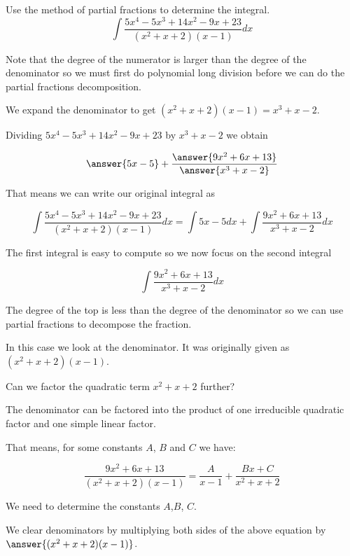 \documentclass{ximera}
\author{Jason Miller}
\begin{document}
\begin{exercise}
Use the method of partial fractions to determine the integral.
\[
\int \frac{5x^{4}-5x^{3}+14x^{2}-9x+23}{(x^{2}+x+2)(x-1)} dx
\]


Note that the degree of the numerator is larger than the degree of the denominator so we must first do polynomial 
long division before we can do the partial fractions decomposition. 

We expand the denominator to get 
$(x^{2}+x+2)(x-1)=x^{3}+x-2$. 

Dividing $5x^{4}-5x^{3}+14x^{2}-9x+23$ by $x^{3}+x-2$ we obtain

\[
\answer{ 5x-5}  + \frac{\answer{9x^{2}+6x+13}}{\answer{x^{3}+x-2}} 
\]


\begin{exercise}

That means we can write our original integral as

\[
\int \frac{5x^{4}-5x^{3}+14x^{2}-9x+23}{(x^{2}+x+2)(x-1)} dx= \int 5x-5 dx + \int \frac{9x^{2}+6x+13}{x^3+x-2} dx
\]

The first integral is easy to compute so we now focus on the second integral 

\[
 \int \frac{9x^{2}+6x+13}{x^{3}+x-2} dx
\]

The degree of the top is less than the degree of the denominator so we can use partial fractions to 
decompose the fraction. 


In this case we look at the denominator. It was originally given as $(x^{2}+x+2)(x-1)$. 

Can we factor the quadratic term $x^{2}+x+2$ further?


  \begin{multipleChoice}
  \end{multipleChoice}


\begin{exercise}

The denominator can be factored into the product of one irreducible quadratic factor and one simple linear factor. 

That means, for some constants $A$, $B$ and $C$ we have:

\[
\frac{9x^{2}+6x+13}{(x^{2}+x+2)(x-1)}= \frac{A}{x-1} + \frac{Bx+C}{x^{2}+x+2}
\]

We need to determine the constants $A$,$B$, $C$. 

We clear denominators by multiplying both sides of the above equation by $\answer{(x^{2}+x+2)(x-1)}$. 


\end{exercise}
\end{exercise}
\end{exercise}
\end{document}
